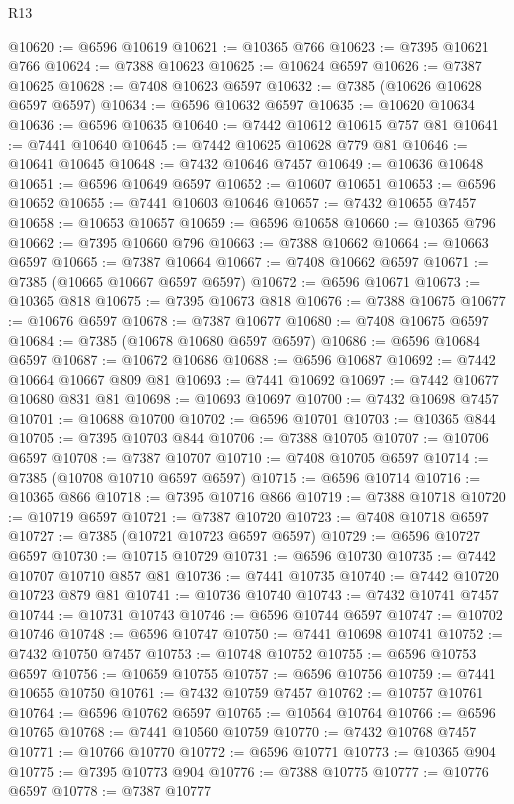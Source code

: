 \begin{lexlean}{R13}
\begin{coremodule}
@10620 := @6596 @10619
@10621 := @10365 @766
@10623 := @7395 @10621 @766
@10624 := @7388 @10623
@10625 := @10624 @6597
@10626 := @7387 @10625
@10628 := @7408 @10623 @6597
@10632 := @7385 (@10626 @10628 @6597 @6597)
@10634 := @6596 @10632 @6597
@10635 := @10620 @10634
@10636 := @6596 @10635
@10640 := @7442 @10612 @10615 @757 @81
@10641 := @7441 @10640
@10645 := @7442 @10625 @10628 @779 @81
@10646 := @10641 @10645
@10648 := @7432 @10646 @7457
@10649 := @10636 @10648
@10651 := @6596 @10649 @6597
@10652 := @10607 @10651
@10653 := @6596 @10652
@10655 := @7441 @10603 @10646
@10657 := @7432 @10655 @7457
@10658 := @10653 @10657
@10659 := @6596 @10658
@10660 := @10365 @796
@10662 := @7395 @10660 @796
@10663 := @7388 @10662
@10664 := @10663 @6597
@10665 := @7387 @10664
@10667 := @7408 @10662 @6597
@10671 := @7385 (@10665 @10667 @6597 @6597)
@10672 := @6596 @10671
@10673 := @10365 @818
@10675 := @7395 @10673 @818
@10676 := @7388 @10675
@10677 := @10676 @6597
@10678 := @7387 @10677
@10680 := @7408 @10675 @6597
@10684 := @7385 (@10678 @10680 @6597 @6597)
@10686 := @6596 @10684 @6597
@10687 := @10672 @10686
@10688 := @6596 @10687
@10692 := @7442 @10664 @10667 @809 @81
@10693 := @7441 @10692
@10697 := @7442 @10677 @10680 @831 @81
@10698 := @10693 @10697
@10700 := @7432 @10698 @7457
@10701 := @10688 @10700
@10702 := @6596 @10701
@10703 := @10365 @844
@10705 := @7395 @10703 @844
@10706 := @7388 @10705
@10707 := @10706 @6597
@10708 := @7387 @10707
@10710 := @7408 @10705 @6597
@10714 := @7385 (@10708 @10710 @6597 @6597)
@10715 := @6596 @10714
@10716 := @10365 @866
@10718 := @7395 @10716 @866
@10719 := @7388 @10718
@10720 := @10719 @6597
@10721 := @7387 @10720
@10723 := @7408 @10718 @6597
@10727 := @7385 (@10721 @10723 @6597 @6597)
@10729 := @6596 @10727 @6597
@10730 := @10715 @10729
@10731 := @6596 @10730
@10735 := @7442 @10707 @10710 @857 @81
@10736 := @7441 @10735
@10740 := @7442 @10720 @10723 @879 @81
@10741 := @10736 @10740
@10743 := @7432 @10741 @7457
@10744 := @10731 @10743
@10746 := @6596 @10744 @6597
@10747 := @10702 @10746
@10748 := @6596 @10747
@10750 := @7441 @10698 @10741
@10752 := @7432 @10750 @7457
@10753 := @10748 @10752
@10755 := @6596 @10753 @6597
@10756 := @10659 @10755
@10757 := @6596 @10756
@10759 := @7441 @10655 @10750
@10761 := @7432 @10759 @7457
@10762 := @10757 @10761
@10764 := @6596 @10762 @6597
@10765 := @10564 @10764
@10766 := @6596 @10765
@10768 := @7441 @10560 @10759
@10770 := @7432 @10768 @7457
@10771 := @10766 @10770
@10772 := @6596 @10771
@10773 := @10365 @904
@10775 := @7395 @10773 @904
@10776 := @7388 @10775
@10777 := @10776 @6597
@10778 := @7387 @10777

\end{coremodule}
\end{lexlean}
